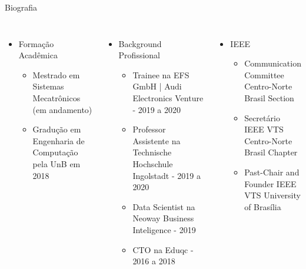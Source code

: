 

  
 
 


\justify
 \maketitle


\begin {frame}[shrink=30]{Biografia}
\small
\begin{columns}[c]
\centering
\begin{itemize}
  \item Formação Acadêmica
  \begin{itemize}
    \item Mestrado em Sistemas Mecatrônicos (em andamento)
    \item Gradução em Engenharia de Computação pela UnB em 2018
  \end{itemize}
\end{itemize}

\begin{itemize}
  \item Background Profissional
  \begin{itemize}
    \item Trainee na EFS GmbH | Audi Electronics Venture - 2019 a 2020
    \item Professor Assistente na Technische Hochschule Ingolstadt - 2019 a 2020
    \item Data Scientist na Neoway Business Inteligence - 2019
    \item CTO na Eduqc - 2016 a 2018
  \end{itemize}
\end{itemize}


\centering

\begin{itemize}
  \item IEEE
  \begin{itemize}
    \item Communication Committee Centro-Norte Brasil Section
    \item Secretário IEEE VTS Centro-Norte Brasil Chapter
    \item Past-Chair and Founder IEEE VTS University of Brasília
  \end{itemize}
\end{itemize}


\end{columns}
\end{frame}
